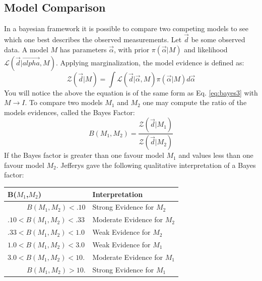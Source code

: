 \documentclass[12pt]{article}
\numberwithin{equation}{section}
\begin{document}
\subsection{Model Comparison}
In a bayesian framework it is possible to compare two competing models to see which one best describes the observed measurements.
Let $\vec{d}$ be some observed data. A model $M$ has parameters $\vec{\alpha}$, with prior $\pi(\vec{\alpha}|M)$ and likelihood $\mathcal{L}(\vec{d}|\vec{alpha},M)$. Applying marginalization, the model evidence is defined as:
\begin{equation} \label{eq:evidence}
	\mathcal{Z}(\vec{d}|M) = \int \mathcal{L}(\vec{d}|\vec{\alpha},M)\pi(\vec{\alpha}|M)d\vec{\alpha}
\end{equation}
You will notice the above the equation is of the same form as Eq. \ref{eq:bayes3} with $M \rightarrow I$. To compare two models $M_1$ and $M_2$ one may compute the ratio of the models evidences, called the Bayes Factor\cite{von2011bayesian}:
\begin{equation} \label{eq:bayesfactor}
	B(M_1,M_2) = \frac{\mathcal{Z}(\vec{d}|M_1)}{\mathcal{Z}(\vec{d}|M_2)} 
\end{equation}
If the Bayes factor is greater than one favour model $M_1$ and values less than one favour model $M_2$. Jefferys\cite
{jeffreys1998theory} gave the following qualitative interpretation of a Bayes factor:
\begin{center}
	\begin{tabular}{l|l}
		\bf{B($M_1$,$M_2$)} & \bf{Interpretation} \\ 
		\hline
		${\qquad \;\;\, B(M_1,M_2) < .10}$ & Strong Evidence for $M_2$ \\
		${.10 < B(M_1,M_2) < .33}$ & Moderate Evidence for $M_2$ \\
		${.33 < B(M_1,M_2) < 1.0}$ & Weak Evidence for $M_2$ \\
		${1.0 < B(M_1,M_2) < 3.0}$ & Weak Evidence for $M_1$ \\
		${3.0 < B(M_1,M_2) < 10.}$ & Moderate Evidence for $M_1$ \\
		${\qquad \;\;\, B(M_1,M_2) > 10.}$ & Strong Evidence for $M_1$ \\
	\end{tabular}
	\label{tab:bayesfactor}
\end{center}
\end{document}
